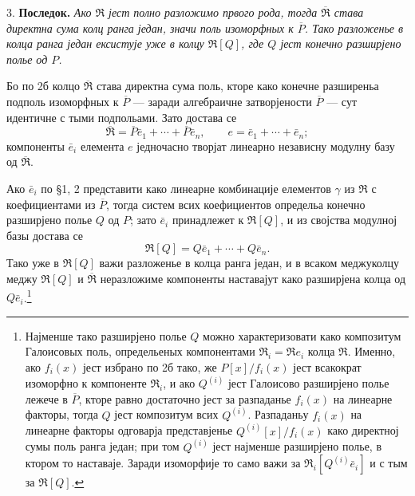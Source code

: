 \documentclass[11pt]{article}
\begin{document}
\setcounter{footnote}{22}

3. \textbf{Последок.} \emph{Ако $\mathfrak R$ јест полно разложимо првого рода, тогда $\overline{\mathfrak R}$ става директна сума колц ранга један, значи поль изоморфных к $\overline P$. Тако разложенье в колца ранга један ексистује уже в колцу $\mathfrak R[Q]$, где $Q$ јест конечно разширјено полье од $P$.}

Бо по 2б колцо $\overline{\mathfrak R}$ става директна сума поль, кторе како конечне разширеньа подполь изоморфных к $\overline P$ --- заради алгебраичне затворјености $\overline P$ --- сут идентичне с тыми подпольами. Зато достава се
\[
        \overline{\mathfrak R}=\overline P\bar e_1+\cdots+\overline P\bar e_n,
        \qquad e=\bar e_1+\cdots+\bar e_n;
\]
компоненты $\bar e_i$ елемента $e$ једночасно творјат линеарно независну модулну базу од $\overline{\mathfrak R}$.

Ако $\bar e_i$ по \S 1, 2 представити како линеарне комбинације елементов $\gamma$ из $\mathfrak R$ с коефициентами из $\overline P$, тогда систем всих коефициентов определьа конечно разширјено полье $Q$ од $P$; зато $\bar e_i$ принадлежет к $\mathfrak R[Q]$, и из својства модулној базы достава се
\[
        \mathfrak R[Q]=Q\bar e_1+\cdots+Q\bar e_n.
\]
Тако уже в $\mathfrak R[Q]$ важи разложенье в колца ранга један, и в всаком меджуколцу меджу $\mathfrak R[Q]$ и $\overline{\mathfrak R}$ неразложиме компоненты наставајут како разширјена колца од $Q\bar e_i$.\footnote{Најменше тако разширјено полье $Q$ можно характеризовати како композитум Галоисовых поль, определьеных компонентами $\mathfrak R_i=\mathfrak R e_i$ колца $\mathfrak R$. Именно, ако $f_i(x)$ јест избрано по 2б тако, же $P[x]/f_i(x)$ јест всакократ изоморфно к компоненте $\mathfrak R_i$, и ако $Q^{(i)}$ јест Галоисово разширјено полье лежече в $\overline P$, кторе равно достаточно јест за разпаданье $f_i(x)$ на линеарне факторы, тогда $Q$ јест композитум всих $Q^{(i)}$. Разпаданьу $f_i(x)$ на линеарне факторы одговарја представјенье $Q^{(i)}[x]/f_i(x)$ како директној сумы поль ранга један; при том $Q^{(i)}$ јест најменше разширјено полье, в ктором то наставаје. Заради изоморфије то само важи за $\mathfrak R_i[Q^{(i)}\bar e_i]$ и с тым за $\mathfrak R[Q]$.}
\end{document}
